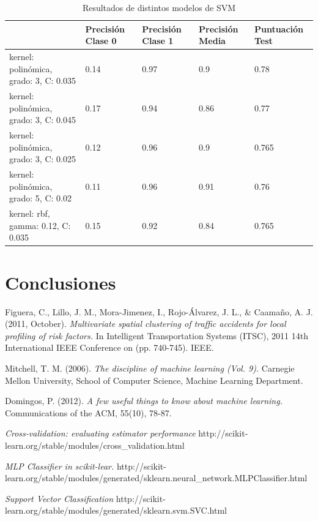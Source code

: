 \documentclass[journal,twoside]{JoPhA}
\begin{document}
	\begin{table}[htb!]
		\begin{center}
			\caption{Resultados de distintos modelos de SVM}
			\begin{tabular}{| p{2.1cm} | p{1cm} | p{1cm} | p{1cm} | p{1.2cm} |}
				\hline
				& Precisión Clase 0 & Precisión Clase 1 & Precisión Media & Puntuación Test   \\ \hline
				kernel: polinómica, grado: 3, C: 0.035 & 0.14                & 0.97                & 0.9              & 0.78  \\ \hline
				kernel: polinómica, grado: 3, C: 0.045 & 0.17                & 0.94               & 0.86             & 0.77  \\ \hline
				kernel: polinómica, grado: 3, C: 0.025 & 0.12 & 0.96 & 0.9 & 0.765 \\ \hline
				kernel: polinómica, grado: 5, C: 0.02 & 0.11 & 0.96 & 0.91 & 0.76	\\ \hline
				kernel: rbf, gamma: 0.12, C: 0.035 & 0.15 & 0.92 & 0.84 & 0.765 \\ \hline
				
			\end{tabular}
			
			\label{tabla:tabla_svm}
		\end{center}
	\end{table}
	

\section{Conclusiones}

\begin{thebibliography}{1}

Figuera, C., Lillo, J. M., Mora-Jimenez, I., Rojo-Álvarez, J. L., \& Caamaño, A. J. (2011, October). \emph{Multivariate spatial clustering of traffic accidents for local profiling of risk factors.} In Intelligent Transportation Systems (ITSC), 2011 14th International IEEE Conference on (pp. 740-745). IEEE.

Mitchell, T. M. (2006). \emph{The discipline of machine learning (Vol. 9).} Carnegie Mellon University, School of Computer Science, Machine Learning Department.

Domingos, P. (2012). \emph{A few useful things to know about machine learning.} Communications of the ACM, 55(10), 78-87.

\emph{Cross-validation: evaluating estimator performance} http://scikit-learn.org/stable/modules/cross\_validation.html

\emph{MLP Classifier in scikit-lear.}
http://scikit-learn.org/stable/modules/generated/sklearn.neural\_network.MLPClassifier.html

\emph{Support Vector Classification}
http://scikit-learn.org/stable/modules/generated/sklearn.svm.SVC.html

\end{thebibliography}
\end{document}
